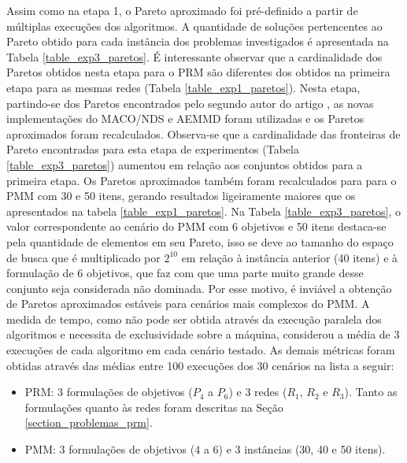 Assim como na etapa 1, o Pareto aproximado foi pré-definido a partir de múltiplas execuções dos algoritmos. A quantidade de soluções pertencentes ao Pareto obtido para cada instância dos problemas investigados é apresentada na Tabela \ref{table_exp3_paretos}. É interessante observar que a cardinalidade dos Paretos obtidos nesta etapa para o PRM são diferentes dos obtidos na primeira etapa para as mesmas redes (Tabela \ref{table_exp1_paretos}). Nesta etapa, partindo-se dos Paretos encontrados pelo segundo autor do artigo \cite{Franca2017}, as novas implementações do MACO/NDS e AEMMD foram utilizadas e os Paretos aproximados foram recalculados. Observa-se que a cardinalidade das fronteiras de Pareto encontradas para esta etapa de experimentos (Tabela \ref{table_exp3_paretos}) aumentou em relação aos conjuntos obtidos para a primeira etapa. Os Paretos aproximados também foram recalculados para para o PMM com 30 e 50 itens, gerando resultados ligeiramente maiores que os apresentados na tabela \ref{table_exp1_paretos}. Na Tabela \ref{table_exp3_paretos}, o valor correspondente ao cenário do PMM com 6 objetivos e 50 itens destaca-se pela quantidade de elementos em seu Pareto, isso se deve ao tamanho do espaço de busca que é multiplicado por $2^{10}$ em relação à instância anterior (40 itens) e à formulação de 6 objetivos, que faz com que uma parte muito grande desse conjunto seja considerada não dominada. Por esse motivo, é inviável a obtenção de Paretos aproximados estáveis para cenários mais complexos do PMM. A medida de tempo, como não pode ser obtida através da execução paralela dos algoritmos e necessita de exclusividade sobre a máquina, considerou a média de 3 execuções de cada algoritmo em cada cenário testado. As demais métricas foram obtidas através das médias entre 100 execuções dos 30 cenários na lista a seguir:

\begin{itemize}
	\item PRM: 3 formulações de objetivos ($P_4$ a $P_6$) e 3 redes ($R_1$, $R_2$ e $R_3$). Tanto as formulações quanto às redes foram descritas na Seção \ref{section_problemas_prm}.
	\item PMM: 3 formulações de objetivos (4 a 6) e 3 instâncias (30, 40 e 50 itens).
\end{itemize}



